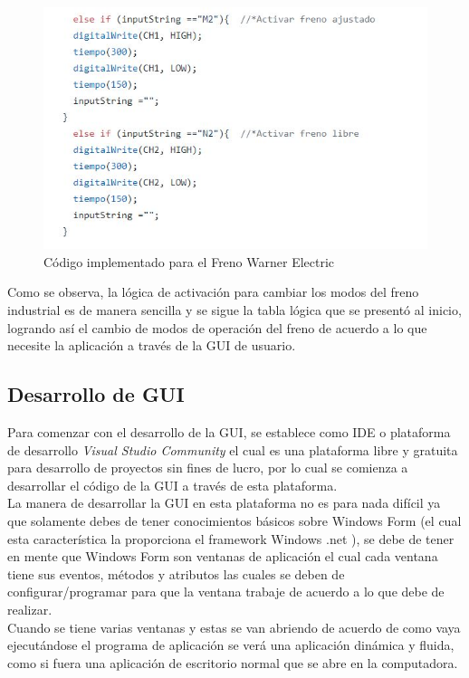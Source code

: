 \documentclass[12pt,titlepage]{article}
\begin{document}
\begin{figure}[htbp]
\hspace*{2.8cm} 
\includegraphics[scale=0.92]{codigo_freno}
\caption{Código implementado para el Freno Warner Electric}
\end{figure}

Como se observa, la lógica de activación para cambiar los modos del freno industrial es de manera sencilla y se sigue la tabla lógica que se presentó al inicio, logrando así el cambio de modos de operación del freno de acuerdo a lo que necesite la aplicación a través de la GUI de usuario. \\
\newpage
\subsection{Desarrollo de GUI}
Para comenzar con el desarrollo de la GUI, se establece como IDE o plataforma de desarrollo \textit{Visual Studio Community} el cual es una plataforma libre y gratuita para desarrollo de proyectos sin fines de lucro, por lo cual se comienza a desarrollar el código de la GUI a través de esta plataforma. \\

La manera de desarrollar la GUI en esta plataforma no es para nada difícil ya que solamente debes de tener conocimientos básicos sobre Windows Form (el cual esta característica la proporciona el framework Windows .net ), se debe de tener en mente que Windows Form son ventanas de aplicación el cual cada ventana tiene sus eventos, métodos y atributos las cuales se deben de configurar/programar para que la ventana trabaje de acuerdo a lo que debe de realizar. \\

Cuando se tiene varias ventanas y estas se van abriendo de acuerdo de como vaya ejecutándose el programa de aplicación se verá una aplicación dinámica y fluida, como si fuera una aplicación de escritorio normal que se abre en la computadora. \\
\end{document}
